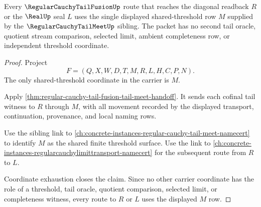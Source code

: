 \begin{theorem}
\label{thm:regular-cauchy-tail-fusion-shared-threshold-exhaustion}
Every $\RegularCauchyTailFusionUp$ route that reaches the diagonal readback $R$ or the $\RealUp$ seal $L$ uses the single displayed shared-threshold row $M$ supplied by the $\RegularCauchyTailMeetUp$ sibling. The packet has no second tail oracle, quotient stream comparison, selected limit, ambient completeness row, or independent threshold coordinate.
\end{theorem}
\begin{proof}
Project
$$
F=(Q,X,W,D,T,M,R,L,H,C,P,N).
$$
The only shared-threshold coordinate in the carrier is $M$.

Apply \autoref{thm:regular-cauchy-tail-fusion-tail-meet-handoff}. It sends each cofinal tail witness to $R$ through $M$, with all movement recorded by the displayed transport, continuation, provenance, and local naming rows.

Use the sibling link to \autoref{ch:concrete-instances-regular-cauchy-tail-meet-namecert} to identify $M$ as the shared finite threshold surface. Use the link to \autoref{ch:concrete-instances-regularcauchylimittransport-namecert} for the subsequent route from $R$ to $L$.

Coordinate exhaustion closes the claim. Since no other carrier coordinate has the role of a threshold, tail oracle, quotient comparison, selected limit, or completeness witness, every route to $R$ or $L$ uses the displayed $M$ row.
\end{proof}


